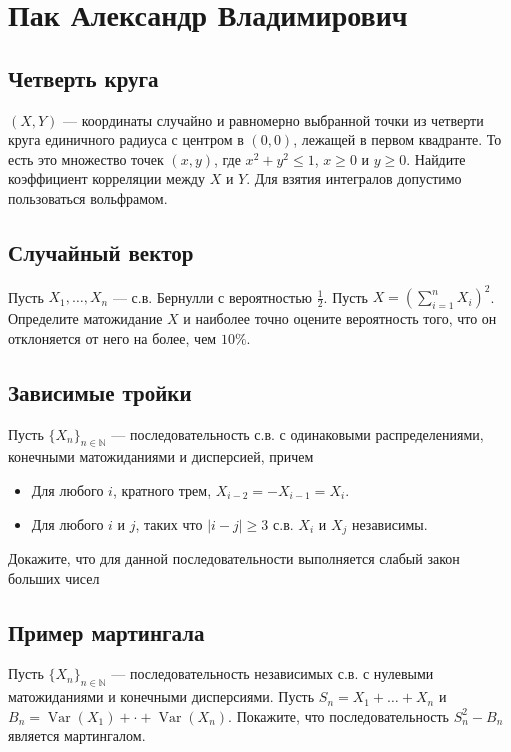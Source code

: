 \documentclass[12pt]{article}
\newcommand\N{\mathbb{N}}
\DeclareMathOperator{\Var}{Var}
\begin{document}
\newpage
\section{Пак Александр Владимирович}

\subsection{Четверть круга}

$(X, Y)$ --- координаты случайно и равномерно выбранной точки из четверти круга единичного радиуса с центром в $(0, 0)$, лежащей в первом квадранте. То есть это множество точек $(x, y)$, где $x^2 + y^2 \le 1$, $x \ge 0$ и $y \ge 0$. Найдите коэффициент корреляции между $X$ и $Y$. Для взятия интегралов  допустимо пользоваться вольфрамом.


\subsection{Случайный вектор}

Пусть $X_1, \dots, X_n$ --- с.в. Бернулли с вероятностью $\frac{1}{2}$. Пусть $X = (\sum_{i = 1}^n X_i)^2$. Определите матожидание $X$ и наиболее точно оцените вероятность того, что он отклоняется от него на более, чем $10\%$.


\subsection{Зависимые тройки}
Пусть $\{X_n\}_{n \in \N}$ --- последовательность с.в. с одинаковыми распределениями, конечными матожиданиями и дисперсией, причем
\begin{itemize}
    \item Для любого $i$, кратного трем, $X_{i - 2} = - X_{i - 1} = X_{i}$. 
    \item Для любого $i$ и $j$, таких что $|i - j| \ge 3$ с.в. $X_i$ и $X_j$ независимы.
\end{itemize}
Докажите, что для данной последовательности выполняется слабый закон больших чисел


\subsection{Пример мартингала}

Пусть $\{X_n\}_{n \in \N}$ --- последовательность независимых с.в. с нулевыми матожиданиями и конечными дисперсиями. Пусть $S_n = X_1 + \dots + X_n$ и $B_n = \Var(X_1) + \cdot + \Var(X_n)$. Покажите, что последовательность $S_n^2 - B_n$ является мартингалом.
\end{document}
